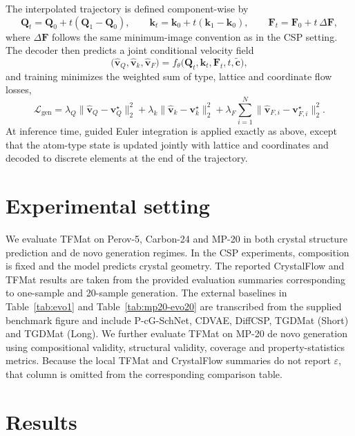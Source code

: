 \documentclass[fleqn,10pt]{wlscirep}
\begin{document}
The interpolated trajectory is defined component-wise by
\begin{equation}
\mathbf{Q}_t = \mathbf{Q}_0 + t(\mathbf{Q}_1 - \mathbf{Q}_0), \qquad
\mathbf{k}_t = \mathbf{k}_0 + t(\mathbf{k}_1 - \mathbf{k}_0), \qquad
\mathbf{F}_t = \mathbf{F}_0 + t\,\Delta \mathbf{F},
\end{equation}
where $\Delta \mathbf{F}$ follows the same minimum-image convention as in the CSP setting. The decoder then predicts a joint conditional velocity field
\begin{equation}
\big(\hat{\mathbf{v}}_{Q}, \hat{\mathbf{v}}_{k}, \hat{\mathbf{v}}_{F}\big)
= f_{\theta}\!\big(\mathbf{Q}_t, \mathbf{k}_t, \mathbf{F}_t, t, \tilde{\mathbf{c}}\big),
\end{equation}
and training minimizes the weighted sum of type, lattice and coordinate flow losses,
\begin{equation}
\mathcal{L}_{\mathrm{gen}} =
\lambda_Q \|\hat{\mathbf{v}}_{Q} - \mathbf{v}_{Q}^{\star}\|_2^2 +
\lambda_k \|\hat{\mathbf{v}}_{k} - \mathbf{v}_{k}^{\star}\|_2^2 +
\lambda_F \sum_{i=1}^{N}\|\hat{\mathbf{v}}_{F,i} - \mathbf{v}_{F,i}^{\star}\|_2^2.
\end{equation}
At inference time, guided Euler integration is applied exactly as above, except that the atom-type state is updated jointly with lattice and coordinates and decoded to discrete elements at the end of the trajectory.

\section*{Experimental setting}
We evaluate TFMat on Perov-5, Carbon-24 and MP-20 in both crystal structure prediction and de novo generation regimes. In the CSP experiments, composition is fixed and the model predicts crystal geometry. The reported CrystalFlow and TFMat results are taken from the provided evaluation summaries corresponding to one-sample and 20-sample generation. The external baselines in Table~\ref{tab:evo1} and Table~\ref{tab:mp20-evo20} are transcribed from the supplied benchmark figure and include P-cG-SchNet, CDVAE, DiffCSP, TGDMat (Short) and TGDMat (Long). We further evaluate TFMat on MP-20 de novo generation using compositional validity, structural validity, coverage and property-statistics metrics. Because the local TFMat and CrystalFlow summaries do not report $\varepsilon$, that column is omitted from the corresponding comparison table.

\section*{Results}
\end{document}
